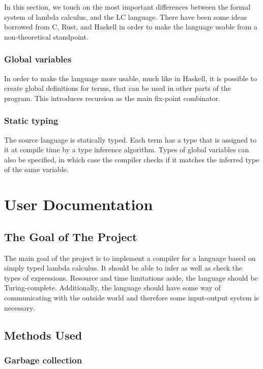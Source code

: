 \documentclass[12pt]{article}
\begin{document}
In this section, we touch on the most important differences between the formal
system of lambda calculus, and the LC language. There have been some ideas
borrowed from C, Rust, and Haskell in order to make the language usable from a
non-theoretical standpoint.

\subsubsection{Global variables}

In order to make the language more usable, much like in Haskell, it is possible
to create global definitions for terms, that can be used in other parts of the
program. This introduces recursion as the main fix-point combinator.

\subsubsection{Static typing}

The source language is statically typed. Each term has a type that is assigned
to it at compile time by a type inference algorithm. Types of global variables
can also be specified, in which case the compiler checks if it matches the
inferred type of the same variable.

\pagebreak
\section{User Documentation}

\subsection{The Goal of The Project}

The main goal of the project is to implement a compiler for a language based on
simply typed lambda calculus. It should be able to infer as well as check the
types of expressions. Resource and time limitations aside, the language should
be Turing-complete. Additionally, the language should have some way of
communicating with the outside world and therefore some input-output system is
necessary.

\subsection{Methods Used}

\subsubsection{Garbage collection}
\end{document}
